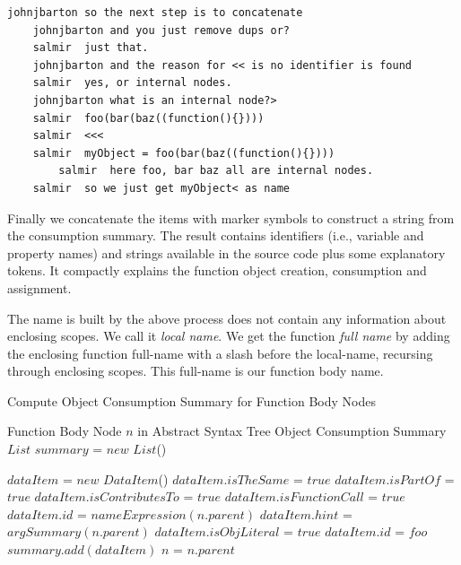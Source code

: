 \documentclass[10pt, preprint]{sigplanconf}
\begin{document}
{\begin{verbatim}
johnjbarton	so the next step is to concatenate
	johnjbarton	and you just remove dups or?
	salmir	just that.
	johnjbarton	and the reason for << is no identifier is found
	salmir	yes, or internal nodes.
	johnjbarton	what is an internal node?>
	salmir	foo(bar(baz((function(){})))
	salmir	<<<
	salmir	myObject = foo(bar(baz((function(){})))
        salmir	here foo, bar baz all are internal nodes.
	salmir	so we just get myObject< as name
\end{verbatim}
Finally we concatenate the items with marker symbols to construct a string from the consumption summary. The result contains identifiers (i.e., variable and property names) and strings available in the source code plus some explanatory tokens. It compactly explains the function object creation, consumption and assignment.
 
The name is built by the above process does not contain any information about enclosing scopes. We call it \textit{local name}. We get the function \textit{full name} by adding the enclosing function full-name with a slash before the local-name, recursing through enclosing scopes. This full-name is our function body name.


\renewcommand{\algorithmicrequire}{\textbf{Input:}}
\renewcommand{\algorithmicensure}{\textbf{Output:}}

\begin{algorithm}                      %
\caption{Compute Object Consumption Summary for Function Body Nodes}          %
\label{alg1}                           %
\begin{algorithmic}                    %
\REQUIRE Function Body Node $n$ in Abstract Syntax Tree
\ENSURE Object Consumption Summary 
\STATE $List$ $summary$ = $new$ $List$()


	\STATE $dataItem$ = $new$ $DataItem$()
    	 \STATE $dataItem.isTheSame$ = $true$
    		\STATE $dataItem.isPartOf$ = $true$
    \ELSE	
	   		\STATE $dataItem.isContributesTo$ = $true$
    \ENDIF
   	    \STATE $dataItem.isFunctionCall$ = $true$
   	    \STATE $dataItem.id$ = $nameExpression(n.parent)$
   	    \STATE $dataItem.hint$ = $argSummary(n.parent)$
   	    \STATE $dataItem.isObjLiteral$ = $true$
   	    \STATE $dataItem.id$ = $foo$
    \ENDIF     
   \STATE $summary.add(dataItem)$
   \STATE $n$ = $n.parent$
\ENDWHILE 
 

\end{algorithmic}
\end{algorithm}}
\end{document}
